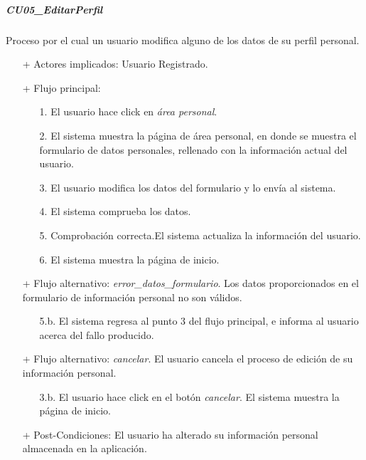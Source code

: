 \documentclass[a4paper]{article}
\begin{document}
            \subparagraph{CU05\_EditarPerfil}
                Proceso por el cual un usuario modifica alguno de los datos de su perfil personal.
                \begin{itemize}
                    \item[+] Actores implicados: Usuario Registrado.
                    \item[+] Flujo principal:
                    \begin{enumerate}
                        \item[1.] El usuario hace click en \emph{área personal}.
                        \item[2.] El sistema muestra la página de área personal, en donde se muestra el formulario de datos personales, rellenado con la información actual del usuario.
                        \item[3.] El usuario modifica los datos del formulario y lo envía al sistema.
                        \item[4.] El sistema comprueba los datos.
                        \item[5.] Comprobación correcta.El sistema actualiza la información del usuario.
                        \item[6.] El sistema muestra la página de inicio.
                    \end{enumerate}
                    \item[+] Flujo alternativo: \emph{error\_datos\_formulario}. Los datos proporcionados en el formulario de información personal no son válidos.
                    \begin{itemize}
                        \item[5.b.] El sistema regresa al punto 3 del flujo principal, e informa al usuario acerca del fallo producido.
                    \end{itemize}
                    \item[+] Flujo alternativo: \emph{cancelar}. El usuario cancela el proceso de edición de su información personal.
                    \begin{itemize}
                        \item[3.b.] El usuario hace click en el botón \emph{cancelar}. El sistema muestra la página de inicio.
                    \end{itemize}
                    \item[+] Post-Condiciones: El usuario ha alterado su información personal almacenada en la aplicación.
                \end{itemize}
\end{document}
